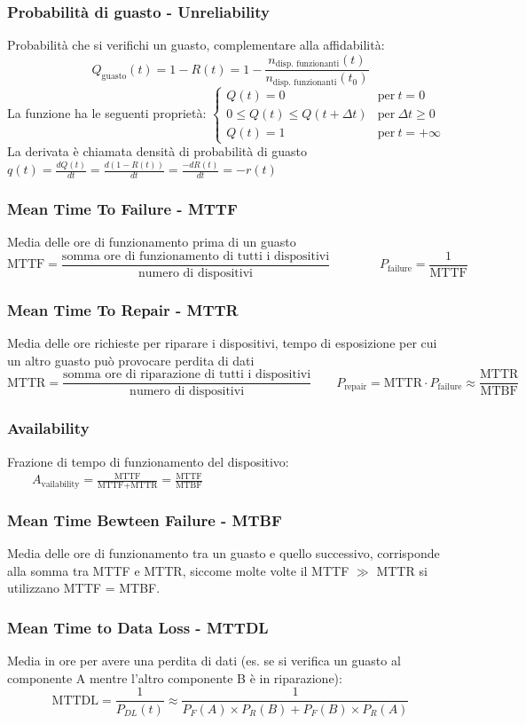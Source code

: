 \documentclass[a4paper]{article}
\begin{document}
\subsubsection*{Probabilità di guasto - Unreliability}
Probabilità che si verifichi un guasto, complementare alla affidabilità:
\[Q_\text{guasto}(t) = 1 - R(t) = 1- \frac{n_\text{disp. funzionanti}(t)}{n_\text{disp. funzionanti}(t_0)}\]
La funzione ha le seguenti proprietà:
\(\begin{cases}
	Q(t) = 0 & \text{per}\ t = 0 \\
	0 \leq Q(t) \leq Q(t + \Delta t) & \text{per}\ \Delta t \geq 0 \\
	Q(t) = 1 & \text{per}\ t = +\infty
\end{cases}\) \\[10pt]
La derivata è chiamata densità di probabilità di guasto \(\displaystyle q(t) = \frac{dQ(t)}{dt} = \frac{d(1-R(t))}{dt} = \frac{-dR(t)}{dt} = -r(t)\)

\subsubsection*{Mean Time To Failure - MTTF}
Media delle ore di funzionamento prima di un guasto
\[\text{MTTF} = \frac{\text{somma ore di funzionamento di tutti i dispositivi}}{\text{numero di dispositivi}} \qquad\qquad P_\text{failure} = \frac{1}{\text{MTTF}}\]

\subsubsection*{Mean Time To Repair - MTTR}
Media delle ore richieste per riparare i dispositivi, tempo di esposizione per cui un altro guasto può provocare perdita di dati
\[\text{MTTR} = \frac{\text{somma ore di riparazione di tutti i dispositivi}}{\text{numero di dispositivi}} \qquad P_\text{repair} = \text{MTTR} \cdot P_\text{failure} \approx \frac{\text{MTTR}}{\text{MTBF}}\]

\subsubsection*{Availability}
Frazione di tempo di funzionamento del dispositivo: \(\qquad \displaystyle A_\text{vailability} = \frac{\text{MTTF}}{\text{MTTF} + \text{MTTR}} = \frac{\text{MTTF}}{\text{MTBF}}\)

\subsubsection*{Mean Time Bewteen Failure - MTBF}
Media delle ore di funzionamento tra un guasto e quello successivo, corrisponde alla somma tra MTTF e MTTR, siccome molte
volte il MTTF \(\gg\) MTTR si utilizzano MTTF = MTBF.

\subsubsection*{Mean Time to Data Loss - MTTDL}
Media in ore per avere una perdita di dati (es. se si verifica un guasto al componente A mentre l'altro componente B è in riparazione):
\[\text{MTTDL} = \frac{1}{P_{DL}(t)} \approx \frac{1}{P_F(A) \times P_R(B) + P_F(B) \times P_R(A)}\]
\end{document}

